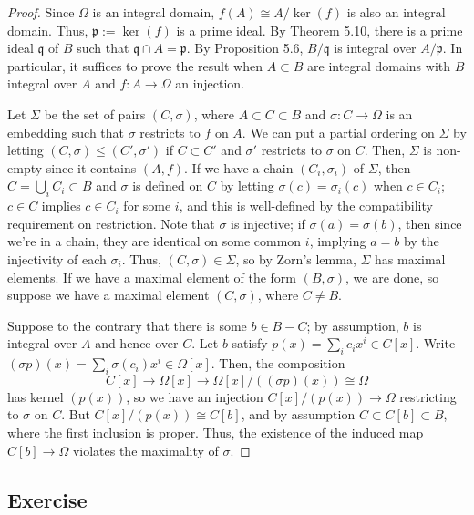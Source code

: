 \begin{proof}
Since $\Omega$ is an integral domain, $f(A) \cong A/\ker(f)$ is also an integral domain. Thus, $\mathfrak{p} := \ker(f)$ is a prime ideal. By Theorem 5.10,
there is a prime ideal $\mathfrak{q}$ of $B$ such that $\mathfrak{q} \cap A = \mathfrak{p}$. By Proposition 5.6, $B/\mathfrak{q}$ is integral over
$A/\mathfrak{p}$. In particular, it suffices to prove the result when $A \subset B$ are integral domains with $B$ integral over $A$ and $f : A \to \Omega$ an
injection.

Let $\Sigma$ be the set of pairs $(C,\sigma)$, where $A \subset C \subset B$ and $\sigma : C \to \Omega$ is an embedding such that $\sigma$ restricts to $f$
on $A$. We can put a partial ordering on $\Sigma$ by letting $(C,\sigma) \le (C',\sigma')$ if $C \subset C'$ and $\sigma'$ restricts to $\sigma$ on $C$. Then,
$\Sigma$ is non-empty since it contains $(A,f)$. If we have a chain $(C_i,\sigma_i)$ of $\Sigma$, then $C = \bigcup_i C_i \subset B$ and $\sigma$ is defined on
$C$ by letting $\sigma(c) = \sigma_i(c)$ when $c \in C_i$; $c \in C$ implies $c \in C_i$ for some $i$, and this is well-defined by the compatibility requirement on 
restriction. Note that $\sigma$ is injective; if $\sigma(a) = \sigma(b)$, then since we're in a chain, they are identical on some common $i$, implying $a=b$ by the injectivity 
of each $\sigma_i$. Thus, $(C,\sigma) \in \Sigma$, so by Zorn's lemma, $\Sigma$ has maximal elements. If we have a maximal element of the form $(B,\sigma)$, we are
done, so suppose we have a maximal element $(C,\sigma)$, where $C \neq B$.

Suppose to the contrary that there is some $b \in B-C$; by assumption, $b$ is integral over $A$ and hence over $C$. Let $b$ satisfy $p(x) = \sum_i c_i x^i \in C[x]$.
Write $(\sigma p)(x) = \sum_i \sigma(c_i)x^i \in \Omega[x]$. Then, the composition
$$C[x] \to \Omega[x] \to \Omega[x]/((\sigma p)(x)) \cong \Omega$$
has kernel $(p(x))$, so we have an injection $C[x]/(p(x)) \to \Omega$ restricting to $\sigma$ on $C$. But $C[x]/(p(x)) \cong C[b]$, and by assumption
$C \subset C[b] \subset B$, where the first inclusion is proper. Thus, the existence of the induced map $C[b] \to \Omega$ violates the maximality of $\sigma$.
\end{proof}

\subsection{Exercise}\label{5.3}

